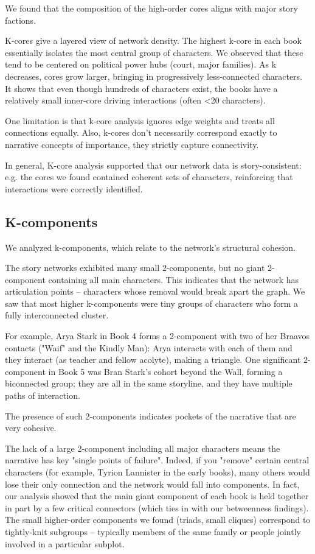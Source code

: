 \documentclass[12pt, a4paper]{article}
\begin{document}
We found that the composition of the high-order cores aligns with major story factions.

K-cores give a layered view of network density. The highest k-core in each book essentially isolates the most central group of characters. We observed that these tend to be centered on political power hubs (court, major families). As k decreases, cores grow larger, bringing in progressively less-connected characters. It shows that even though hundreds of characters exist, the books have a relatively small inner-core driving interactions (often <20 characters).

One limitation is that k-core analysis ignores edge weights and treats all connections equally. Also, k-cores don't necessarily correspond exactly to narrative concepts of importance, they strictly capture connectivity. 

In general, K-core analysis supported that our network data is story-consistent: e.g. the cores we found contained coherent sets of characters, reinforcing that interactions were correctly identified.


\subsection*{K-components}

We analyzed k-components, which relate to the network's structural cohesion.

The story networks exhibited many small 2-components, but no giant 2-component containing all main characters. This indicates that the network has articulation points – characters whose removal would break apart the graph. 
We saw that most higher k-components were tiny groups of characters who form a fully interconnected cluster. 

For example, Arya Stark in Book 4 forms a 2-component with two of her Braavos contacts ("Waif" and the Kindly Man): Arya interacts with each of them and they interact (as teacher and fellow acolyte), making a triangle. One significant 2-component in Book 5 was Bran Stark's cohort beyond the Wall, forming a biconnected group; they are all in the same storyline, and they have multiple paths of interaction. 

The presence of such 2-components indicates pockets of the narrative that are very cohesive. 
 
The lack of a large 2-component including all major characters means the narrative has key "single points of failure". Indeed, if you "remove" certain central characters (for example, Tyrion Lannister in the early books), many others would lose their only connection and the network would fall into components. In fact, our analysis showed that the main giant component of each book is held together in part by a few critical connectors (which ties in with our betweenness findings). The small higher-order components we found (triads, small cliques) correspond to tightly-knit subgroups – typically members of the same family or people jointly involved in a particular subplot.
\end{document}
